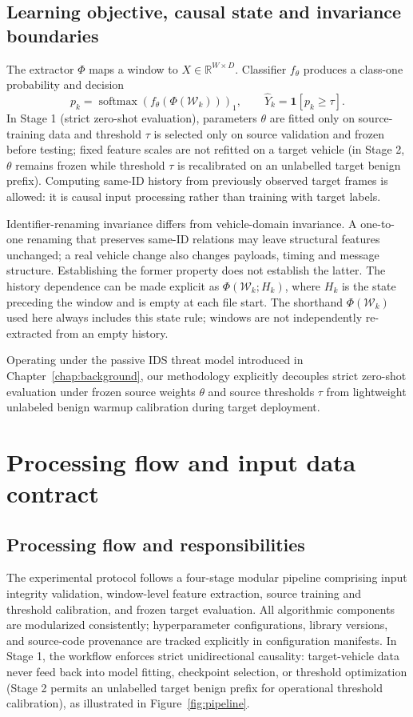 \documentclass[12pt, a4paper, reqno, oneside]{book}
\begin{document}
\subsection{Learning objective, causal state and invariance boundaries}
The extractor $\Phi$ maps a window to $X\in\mathbb R^{W\times D}$. Classifier $f_\theta$ produces a class-one probability and decision
\begin{equation}
p_k=\operatorname{softmax}(f_\theta(\Phi(\mathcal W_k)))_1,
\qquad \widehat Y_k=\mathbf{1}[p_k\geq\tau].
\end{equation}
In Stage 1 (strict zero-shot evaluation), parameters $\theta$ are fitted only on source-training data and threshold $\tau$ is selected only on source validation and frozen before testing; fixed feature scales are not refitted on a target vehicle (in Stage 2, $\theta$ remains frozen while threshold $\tau$ is recalibrated on an unlabelled target benign prefix). Computing same-ID history from previously observed target frames is allowed: it is causal input processing rather than training with target labels.

Identifier-renaming invariance differs from vehicle-domain invariance. A one-to-one renaming that preserves same-ID relations may leave structural features unchanged; a real vehicle change also changes payloads, timing and message structure. Establishing the former property does not establish the latter.
The history dependence can be made explicit as $\Phi(\mathcal W_k;H_k)$, where $H_k$ is the state preceding the window and is empty at each file start. The shorthand $\Phi(\mathcal W_k)$ used here always includes this state rule; windows are not independently re-extracted from an empty history.

Operating under the passive IDS threat model introduced in Chapter~\ref{chap:background}, our methodology explicitly decouples strict zero-shot evaluation under frozen source weights $\theta$ and source thresholds $\tau$ from lightweight unlabeled benign warmup calibration during target deployment.

\section{Processing flow and input data contract}
\subsection{Processing flow and responsibilities}
The experimental protocol follows a four-stage modular pipeline comprising input integrity validation, window-level feature extraction, source training and threshold calibration, and frozen target evaluation. All algorithmic components are modularized consistently; hyperparameter configurations, library versions, and source-code provenance are tracked explicitly in configuration manifests. In Stage 1, the workflow enforces strict unidirectional causality: target-vehicle data never feed back into model fitting, checkpoint selection, or threshold optimization (Stage 2 permits an unlabelled target benign prefix for operational threshold calibration), as illustrated in Figure~\ref{fig:pipeline}.
\end{document}
